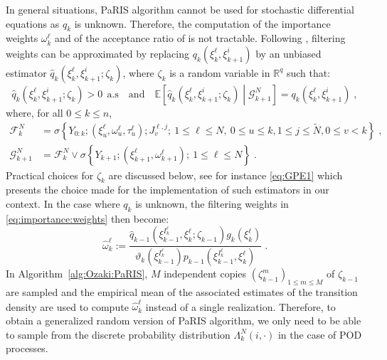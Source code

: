 \documentclass[12pt]{article}
\newcommand{\eqsp}{\;}
\newcommand{\1}{\mathrm{1}}
\newcommand{\qk}{q_{k}}
\begin{document}
In general situations, PaRIS algorithm cannot be used for stochastic differential equations as $\qk$ is unknown. 
Therefore, the computation of the importance weights $\omega_{k}^{\ell}$ and of the acceptance ratio of \cite{douc:garivier:moulines:olsson:2011} is not tractable. 
Following \cite{fearnhead:papaspiliopoulos:roberts:2008,olsson:strojby:2011}, filtering weights can be approximated by replacing $\qk(\xi^{\ell}_{k},\xi_{k+1}^{i})$  by an unbiased  estimator $\widehat{q}_k(\xi^{\ell}_{k},\xi_{k+1}^{i};\zeta_k)$, where $\zeta_k$ is a random variable in $\mathbb{R}^q$ such that:
\[
\widehat{q}_k(\xi^{\ell}_{k},\xi_{k+1}^{i};\zeta_k)> 0~~\text{a.s}\quad\mbox{and}\quad
\mathbb{E}\left[\widehat{q}_k(\xi^{\ell}_{k},\xi_{k+1}^{i};\zeta_k)\middle| \mathcal{G}_{k+1}^N\right] = \qk(\xi^{\ell}_{k},\xi_{k+1}^{i})\eqsp,
\]
where, for all $0\le k \le n$, 
\begin{align*}
\mathcal{F}_{k}^N &= \sigma\left\{Y_{0:k};(\xi^{\ell}_{u},\omega^{\ell}_{u},\tau^{\ell}_{u});J_{v}^{\ell,j};~1\le \ell\le N,~0\le u\le k, 1\le j \le \widetilde{N}, 0\le v< k\right\}\eqsp,\\
\mathcal{G}_{k+1}^N &= \mathcal{F}_{k}^N \vee \sigma\left\{Y_{k+1};(\xi^{\ell}_{k+1},\omega^{\ell}_{k+1});~1\le \ell\le N\right\}\eqsp.
\end{align*}
Practical choices for $\zeta_k$ are discussed below, see for instance \eqref{eq:GPE1} which presents the choice made for the implementation of such estimators in our context. 
In the case where $\qk$ is unknown, the filtering weights in \eqref{eq:importance:weights} then become:
\begin{equation}
\label{eq:random:weight}
\widehat{\omega}^{\ell}_k := \frac{\widehat{q}_{k-1}(\xi_{k-1}^{I^{\ell}_k},\xi^{\ell}_k;\zeta_{k-1})g_k(\xi^{\ell}_k)}{\vartheta_k(\xi^{I^{\ell}_k}_{k-1}) p_{k-1} (\xi_{k-1}^{I^{\ell}_k},\xi^{\ell}_k)}\eqsp.
\end{equation}
In Algorithm~\ref{alg:Ozaki:PaRIS}, $M$ independent copies $(\zeta^m_{k-1})_{1\le m \le M}$ of $\zeta_{k-1}$ are sampled and the empirical mean of the associated estimates of the transition density are used to compute $\widehat{\omega}^{\ell}_k$ instead of a single realization. 
Therefore, to obtain a generalized random version of PaRIS algorithm, we only need to be able to sample from the discrete probability distribution $\Lambda_k^N(i,\cdot)$ in the case of POD processes.
\end{document}
